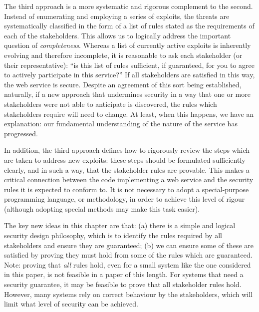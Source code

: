 The third approach is a more systematic and rigorous complement to the second. Instead of enumerating and employing a series of exploits, the threats are systematically classified in the form of a list of rules stated as the requirements of each of the stakeholders. This allows us to logically address the important question of {\em completeness}. Whereas a list of currently active exploits is inherently evolving and therefore incomplete, it is reasonable to ask each stakeholder (or their representative): ``is this list of rules sufficient, if guaranteed, for you to agree to actively participate in this service?'' If all stakeholders are satisfied in this way, the web service is secure. Despite an agreement of this sort being established, naturally, if a new approach that undermines security in a way that one or more stakeholders were not able to anticipate is discovered, the rules which stakeholders require will need to change. At least, when this happens, we have an explanation: our fundamental understanding of the nature of the service has progressed.

In addition, the third approach defines how to rigorously review the steps which are taken to address new exploits: these steps should be formulated sufficiently clearly, and in such a way, that the stakeholder rules are provable. This makes a critical connection between the code implementing a web service and the security rules it is expected to conform to. It is not necessary to adopt a special-purpose programming language, or methodology, in order to achieve this level of rigour (although adopting special methods may make this task easier).

The key new ideas in this chapter are that: (a) there is a simple and logical security design philosophy, which is to identify the rules required by all stakeholders and ensure they are guaranteed; (b) we can ensure some of these are satisfied by proving they must hold from some of the rules which are guaranteed. Note: proving that {\em all} rules hold, even for a small system like the one considered in this paper, is not feasible in a paper of this length. For systems that need a security guarantee, it may be feasible to prove that all stakeholder rules hold. However, many systems rely on correct behaviour by the stakeholders, which will limit what level of security can be achieved.

	




